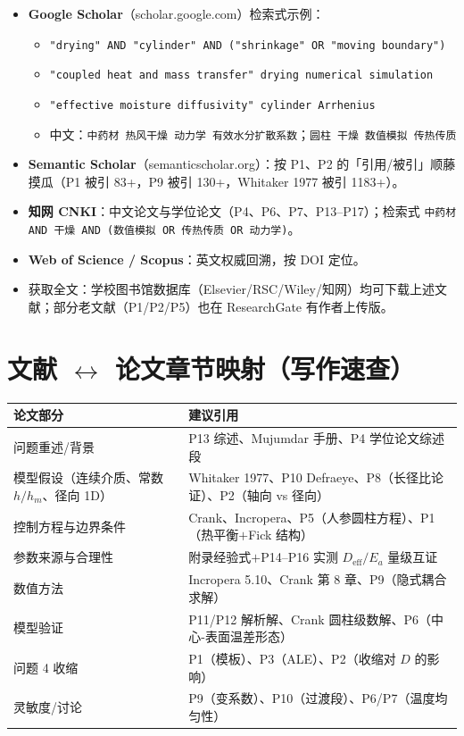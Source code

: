 \documentclass[12pt,a4paper]{ctexart}
\begin{document}
\begin{itemize}
\item \textbf{Google Scholar}（scholar.google.com）检索式示例：
  \begin{itemize}
  \item \texttt{"drying" AND "cylinder" AND ("shrinkage" OR "moving boundary")}
  \item \texttt{"coupled heat and mass transfer" drying numerical simulation}
  \item \texttt{"effective moisture diffusivity" cylinder Arrhenius}
  \item 中文：\texttt{中药材 热风干燥 动力学 有效水分扩散系数}；\texttt{圆柱 干燥 数值模拟 传热传质}
  \end{itemize}
\item \textbf{Semantic Scholar}（semanticscholar.org）：按 P1、P2 的「引用/被引」顺藤摸瓜（P1 被引 83+，P9 被引 130+，Whitaker 1977 被引 1183+）。
\item \textbf{知网 CNKI}：中文论文与学位论文（P4、P6、P7、P13--P17）；检索式 \texttt{中药材 AND 干燥 AND (数值模拟 OR 传热传质 OR 动力学)}。
\item \textbf{Web of Science / Scopus}：英文权威回溯，按 DOI 定位。
\item 获取全文：学校图书馆数据库（Elsevier/RSC/Wiley/知网）均可下载上述文献；部分老文献（P1/P2/P5）也在 ResearchGate 有作者上传版。
\end{itemize}

\section{文献 $\leftrightarrow$ 论文章节映射（写作速查）}

\begin{center}
\begin{tabular}{p{4.6cm}p{10.6cm}}
\toprule
论文部分 & 建议引用 \\
\midrule
问题重述/背景 & P13 综述、Mujumdar 手册、P4 学位论文综述段 \\
模型假设（连续介质、常数 $h/h_m$、径向 1D） & Whitaker 1977、P10 Defraeye、P8（长径比论证）、P2（轴向 vs 径向） \\
控制方程与边界条件 & Crank、Incropera、P5（人参圆柱方程）、P1（热平衡$+$Fick 结构） \\
参数来源与合理性 & 附录经验式$+$P14--P16 实测 $D_{\mathrm{eff}}/E_a$ 量级互证 \\
数值方法 & Incropera 5.10、Crank 第 8 章、P9（隐式耦合求解） \\
模型验证 & P11/P12 解析解、Crank 圆柱级数解、P6（中心-表面温差形态） \\
问题 4 收缩 & P1（模板）、P3（ALE）、P2（收缩对 $D$ 的影响） \\
灵敏度/讨论 & P9（变系数）、P10（过渡段）、P6/P7（温度均匀性） \\
\bottomrule
\end{tabular}
\end{center}
\end{document}
